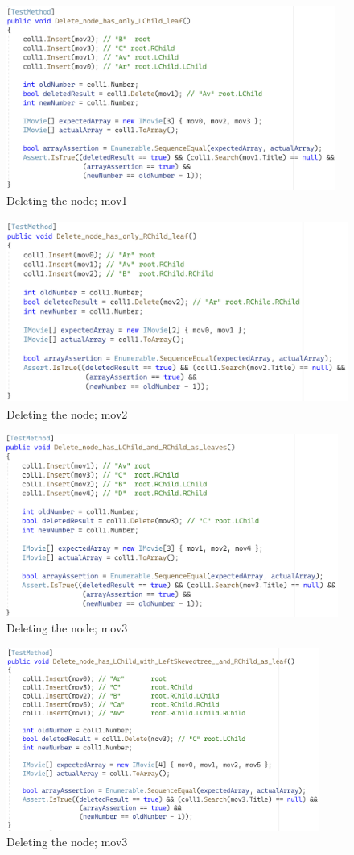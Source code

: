 \documentclass[a4paper]{article}
\begin{document}
\begin{figure}[H]
    \includegraphics[height=6cm]{data/Delete_node_has_only_LChild_leaf.png}
    \caption{Deleting the node; mov1}
\end{figure}
\begin{figure}[H]
    \includegraphics[height=6cm]{data/Delete_node_has_only_RChild_leaf.png}
    \caption{Deleting the node; mov2}
\end{figure}
\begin{figure}[H]
    \includegraphics[height=6cm]{data/Delete_node_has_LChild_and_RChild_as_leaves.png}
    \caption{Deleting the node; mov3}
\end{figure}
\begin{figure}[H]
    \includegraphics[height=6cm]{data/Delete_node_has_LChild_with_LeftSkewedtree__and_RChild_as_leaf.png}
    \caption{Deleting the node; mov3}
\end{figure}
\end{document}
